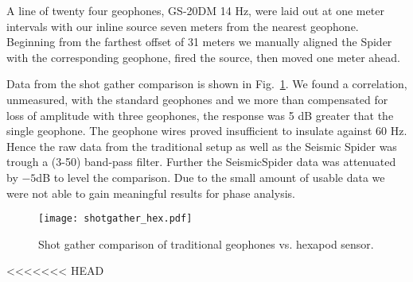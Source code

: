 A line of twenty four geophones, GS-20DM 14 Hz, were laid out at one meter intervals with our inline source seven meters from the nearest geophone. Beginning from the farthest offset of 31 meters we manually aligned the Spider with the corresponding geophone, fired the source, then moved one meter ahead. 

Data from the shot gather comparison is shown in Fig.~\ref{fig:shotgatherHexpod}.
We found a correlation, unmeasured, with the standard geophones and we more than compensated for loss of amplitude with three geophones, the response was 5 dB greater that the single geophone. The geophone wires proved insufficient to insulate against 60 Hz. Hence the raw data from the traditional setup as well as the Seismic Spider was trough a (3-50) band-pass filter. Further the SeismicSpider data was attenuated by $-5$dB to level the comparison.  Due to the small amount of usable data we were not able to gain meaningful results for phase analysis.   

\begin{figure} \centering
  {\texttt{[image: shotgather\_hex.pdf]}}
 \caption{Shot gather comparison of traditional geophones vs. hexapod sensor. 
 \label{fig:shotgatherHexpod}}
\end{figure}


<<<<<<< HEAD
